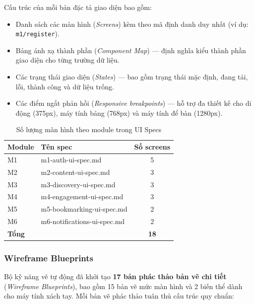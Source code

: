 \documentclass[13pt,a4paper,oneside]{extreport}
\numberwithin{equation}{chapter}
\numberwithin{figure}{chapter}
\numberwithin{table}{chapter}
\begin{document}
Cấu trúc của mỗi bản đặc tả giao diện bao gồm:
\begin{itemize}
    \item Danh sách các màn hình (\textit{Screens}) kèm theo mã định danh duy nhất (ví dụ: \texttt{m1/register}).
    \item Bảng ánh xạ thành phần (\textit{Component Map}) — định nghĩa kiểu thành phần giao diện cho từng trường dữ liệu.
    \item Các trạng thái giao diện (\textit{States}) — bao gồm trạng thái mặc định, đang tải, lỗi, thành công và dữ liệu trống.
    \item Các điểm ngắt phản hồi (\textit{Responsive breakpoints}) — hỗ trợ đa thiết kế cho di động (375px), máy tính bảng (768px) và máy tính để bàn (1280px).
\end{itemize}

\begin{table}[H]
\centering
\caption{Số lượng màn hình theo module trong UI Specs}
\begin{tabular}{|p{1cm}|p{5cm}|c|}
\hline
\textbf{Module} & \textbf{Tên spec} & \textbf{Số screens} \\
\hline
M1 & m1-auth-ui-spec.md & 5 \\
\hline
M2 & m2-content-ui-spec.md & 3 \\
\hline
M3 & m3-discovery-ui-spec.md & 3 \\
\hline
M4 & m4-engagement-ui-spec.md & 3 \\
\hline
M5 & m5-bookmarking-ui-spec.md & 2 \\
\hline
M6 & m6-notifications-ui-spec.md & 2 \\
\hline
\textbf{Tổng} & & \textbf{18} \\
\hline
\end{tabular}
\end{table}

\subsubsection{Wireframe Blueprints}

Bộ kỹ năng vẽ tự động đã khởi tạo \textbf{17 bản phác thảo bản vẽ chi tiết} (\textit{Wireframe Blueprints}), bao gồm 15 bản vẽ mức màn hình và 2 biến thể dành cho máy tính xách tay. Mỗi bản vẽ phác thảo tuân thủ cấu trúc quy chuẩn:
\end{document}
